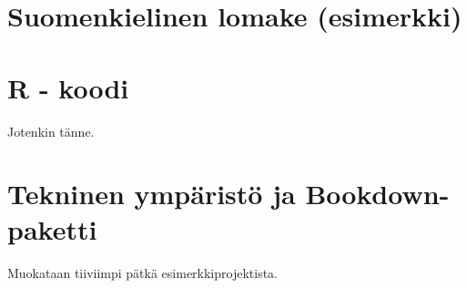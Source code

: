 \documentclass[finnish,]{book}
\theoremstyle{definition}
\theoremstyle{definition}
\theoremstyle{definition}
\theoremstyle{remark}
\begin{document}
\hypertarget{suomenkielinen-lomake-esimerkki}{%
\section{Suomenkielinen lomake
(esimerkki)}\label{suomenkielinen-lomake-esimerkki}}

\hypertarget{r---koodi}{%
\section{R - koodi}\label{r---koodi}}

Jotenkin tänne.

\hypertarget{tekninen-ymparisto-ja-bookdown-paketti}{%
\section{Tekninen ympäristö ja
Bookdown-paketti}\label{tekninen-ymparisto-ja-bookdown-paketti}}

Muokataan tiiviimpi pätkä esimerkkiprojektista.


\end{document}

